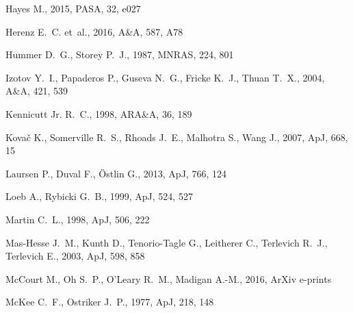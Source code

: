 \documentclass[a4,useAMS,usenatbib,usegraphicx]{mn2e}
\newcommand{\apj}{ApJ}
\newcommand{\pasa}{PASA}
\newcommand{\mnras}{MNRAS}
\newcommand{\aap}{A\&A}
\newcommand{\araa}{ARA\&A}
\begin{document}
\begin{thebibliography}{}
{Hayes} M.,  2015, \pasa, 32, e027

{Herenz} E.~C.  et~al., 2016, \aap, 587, A78

{Hummer} D.~G.,  {Storey} P.~J.,  1987, \mnras, 224, 801

{Izotov} Y.~I.,  {Papaderos} P.,  {Guseva} N.~G.,  {Fricke} K.~J.,    {Thuan}
  T.~X.,  2004, \aap, 421, 539

{Kennicutt} Jr. R.~C.,  1998, \araa, 36, 189

{Kova{\v c}} K.,  {Somerville} R.~S.,  {Rhoads} J.~E.,  {Malhotra} S.,
  {Wang} J.,  2007, \apj, 668, 15

{Laursen} P.,  {Duval} F.,    {{\"O}stlin} G.,  2013, \apj, 766, 124

{Loeb} A.,  {Rybicki} G.~B.,  1999, \apj, 524, 527

{Martin} C.~L.,  1998, \apj, 506, 222

{Mas-Hesse} J.~M.,  {Kunth} D.,  {Tenorio-Tagle} G.,  {Leitherer} C.,
  {Terlevich} R.~J.,    {Terlevich} E.,  2003, \apj, 598, 858

{McCourt} M.,  {Oh} S.~P.,  {O'Leary} R.~M.,    {Madigan} A.-M.,  2016, ArXiv
  e-prints

{McKee} C.~F.,  {Ostriker} J.~P.,  1977, \apj, 218, 148


\end{thebibliography}
\end{document}
